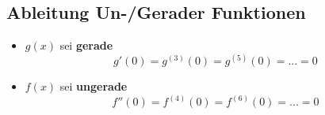 \subsection{Ableitung Un-/Gerader Funktionen}
\begin{itemize}
    \item $g(x)$ sei \textbf{gerade}
        $$
            g'(0)=g^{(3)}(0)=g^{(5)}(0)=...=0
        $$
    \item $f(x)$ sei \textbf{ungerade}
        $$
            f''(0)=f^{(4)}(0)=f^{(6)}(0)=...=0
        $$
\end{itemize}